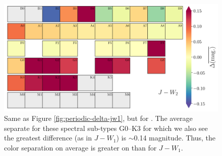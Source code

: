 \begin{figure}
    \centering
    \includegraphics[width=1.0\textwidth,clip=true]{Figures/periodic/periodic-delta_J_W2.png}
    \caption{Same as Figure \ref{fig:periodic-delta-jw1}, but for \jwtwo. The average separate for these spectral sub-types G0--K3 for which we also see the greatest difference (as in $J-W_{1}$) is $\sim$0.14 magnitude. Thus, the color separation on average is greater on \jwtwo than for $J-W_{1}$.}
    \label{fig:periodic-delta-jw2}
\end{figure}
